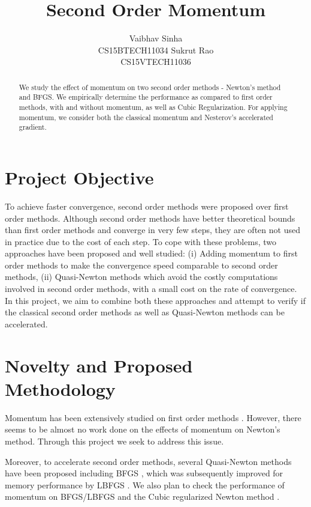 \documentclass{article}
\title{Second Order Momentum}
\author{
  Vaibhav Sinha \\
  CS15BTECH11034
  \And
  Sukrut Rao \\
  CS15VTECH11036
}
\begin{document}
\maketitle

\begin{abstract}
  We study the effect of momentum on two second order methods - Newton's method and BFGS. We empirically determine the performance as compared to first order methods, with and without momentum, as well as Cubic Regularization. For applying momentum, we consider both the classical momentum and Nesterov's accelerated gradient.
\end{abstract}

\section{Project Objective}

To achieve faster convergence, second order methods were proposed over first order methods. Although second order methods have better theoretical bounds than first order methods and converge in very few steps, they are often not used in practice due to the cost of each step. To cope with these problems, two approaches have been proposed and well studied: (i) Adding momentum \cite{POLYAK19641,Sutskever} to first order methods to make the convergence speed comparable to second order methods, (ii) Quasi-Newton methods \citep{davidon,broyden1965class,nocedal1980updating} which avoid the costly computations involved in second order methods, with a small cost on the rate of convergence. In this project, we aim to combine both these approaches and attempt to verify if the classical second order methods as well as Quasi-Newton methods can be accelerated.

\section{Novelty and Proposed Methodology}

Momentum has been extensively studied on first order methods \citep{POLYAK19641,Sutskever}. However, there seems to be almost no work done on the effects of momentum on Newton’s method. Through this project we seek to address this issue.

Moreover, to accelerate second order methods, several Quasi-Newton methods have been proposed including BFGS \citep{broyden1965class}, which was subsequently improved for memory performance by LBFGS \citep{nocedal1980updating}. We also plan to check the performance of momentum on BFGS/LBFGS and the Cubic regularized Newton method \citep{nesterov2006cubic}.
\end{document}
